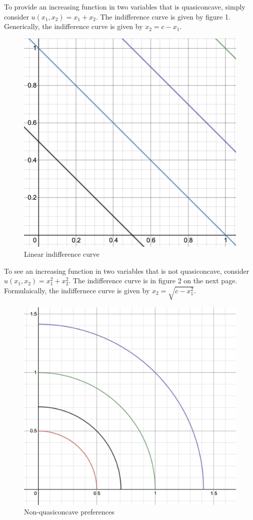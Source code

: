 \documentclass[10pt,letter]{article}
\begin{document}
To provide an increasing function in two variables that is quasiconcave, simply consider $u(x_1, x_2) = x_1 + x_2$. The indifference curve is given by figure 1. Generically, the indifference curve is given by $x_2 = c - x_1$.
\begin{figure}
\caption{ Linear indifference curve}
\centering
\includegraphics[scale=0.4]{linear_indiff}
\end{figure}
To see an increasing function in two variables that is not quasiconcave, consider $u(x_1, x_2) = x_1^2 + x_2^2$. The indifference curve is in figure 2 on the next page.
Formulaically, the indiffernece curve is given by $x_2 = \sqrt{c - x_1^2}$.
\begin{figure}
\caption{ Non-quasiconcave preferences}
\centering
\includegraphics[scale=0.4]{concave_indiff}
\end{figure}
\end{document}

